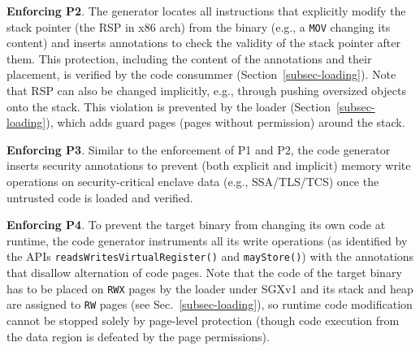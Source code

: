 
\vspace{3pt}\noindent\textbf{Enforcing P2}. 
The generator locates all instructions that explicitly modify the stack pointer (the RSP in x86 arch) from the binary (e.g., a \texttt{MOV} changing its content) and inserts annotations to check the validity of the stack pointer after them. This protection, including the content of the annotations and their placement, is verified by the code consummer (Section~\ref{subsec-loading}). 
Note that RSP can also be changed implicitly, e.g., through pushing oversized objects onto the stack. This violation is prevented by the loader (Section~\ref{subsec-loading}), which adds guard pages (pages without permission) around the stack. 


\vspace{3pt}\noindent\textbf{Enforcing P3}. Similar to the enforcement of P1 and P2, the code generator inserts security annotations to prevent (both explicit and implicit) memory write operations on security-critical enclave data (e.g., SSA/TLS/TCS) once the untrusted code is loaded and verified. 

\vspace{3pt}\noindent\textbf{Enforcing P4}. To prevent the target binary from changing its own code at runtime, the code generator instruments all its write operations (as identified by the APIs \verb|readsWritesVirtualRegister()| and \verb|mayStore()|) with the annotations that disallow alternation of code pages. Note that the code of the target binary has to be placed on \texttt{RWX} pages by the loader under SGXv1 and its stack and heap are assigned to \texttt{RW} pages (see Sec.~\ref{subsec-loading}), so runtime code modification cannot be stopped solely by page-level protection (though code execution from the data region is defeated by the page permissions). 


